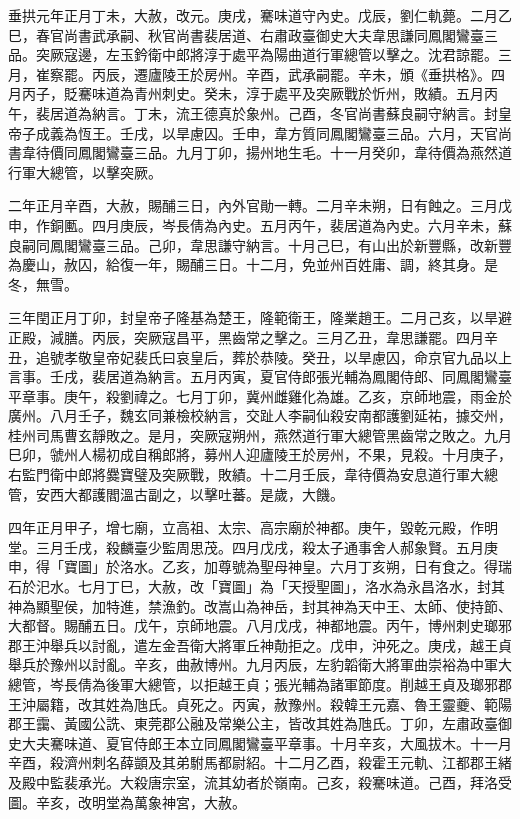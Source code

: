 \begin{pinyinscope}
 垂拱元年正月丁未，大赦，改元。庚戌，騫味道守內史。戊辰，劉仁軌薨。二月乙巳，春官尚書武承嗣、秋官尚書裴居道、右肅政臺御史大夫韋思謙同鳳閣鸞臺三品。突厥寇邊，左玉鈐衛中郎將淳于處平為陽曲道行軍總管以擊之。沈君諒罷。三月，崔察罷。丙辰，遷廬陵王於房州。辛酉，武承嗣罷。辛未，頒《垂拱格》。四月丙子，貶騫味道為青州刺史。癸未，淳于處平及突厥戰於忻州，敗績。五月丙午，裴居道為納言。丁未，流王德真於象州。己酉，冬官尚書蘇良嗣守納言。封皇帝子成義為恆王。壬戌，以旱慮囚。壬申，韋方質同鳳閣鸞臺三品。六月，天官尚書韋待價同鳳閣鸞臺三品。九月丁卯，揚州地生毛。十一月癸卯，韋待價為燕然道行軍大總管，以擊突厥。



 二年正月辛酉，大赦，賜酺三日，內外官勛一轉。二月辛未朔，日有蝕之。三月戊申，作銅匭。四月庚辰，岑長倩為內史。五月丙午，裴居道為內史。六月辛未，蘇良嗣同鳳閣鸞臺三品。己卯，韋思謙守納言。十月己巳，有山出於新豐縣，改新豐為慶山，赦囚，給復一年，賜酺三日。十二月，免並州百姓庸、調，終其身。是冬，無雪。



 三年閏正月丁卯，封皇帝子隆基為楚王，隆範衛王，隆業趙王。二月己亥，以旱避正殿，減膳。丙辰，突厥寇昌平，黑齒常之擊之。三月乙丑，韋思謙罷。四月辛丑，追號孝敬皇帝妃裴氏曰哀皇后，葬於恭陵。癸丑，以旱慮囚，命京官九品以上言事。壬戌，裴居道為納言。五月丙寅，夏官侍郎張光輔為鳳閣侍郎、同鳳閣鸞臺平章事。庚午，殺劉禕之。七月丁卯，冀州雌雞化為雄。乙亥，京師地震，雨金於廣州。八月壬子，魏玄同兼檢校納言，交趾人李嗣仙殺安南都護劉延祐，據交州，桂州司馬曹玄靜敗之。是月，突厥寇朔州，燕然道行軍大總管黑齒常之敗之。九月巳卯，虢州人楊初成自稱郎將，募州人迎廬陵王於房州，不果，見殺。十月庚子，右監門衛中郎將爨寶璧及突厥戰，敗績。十二月壬辰，韋待價為安息道行軍大總管，安西大都護閻溫古副之，以擊吐蕃。是歲，大饑。



 四年正月甲子，增七廟，立高祖、太宗、高宗廟於神都。庚午，毀乾元殿，作明堂。三月壬戌，殺麟臺少監周思茂。四月戊戌，殺太子通事舍人郝象賢。五月庚申，得「寶圖」於洛水。乙亥，加尊號為聖母神皇。六月丁亥朔，日有食之。得瑞石於汜水。七月丁巳，大赦，改「寶圖」為「天授聖圖」，洛水為永昌洛水，封其神為顯聖侯，加特進，禁漁釣。改嵩山為神岳，封其神為天中王、太師、使持節、大都督。賜酺五日。戊午，京師地震。八月戊戌，神都地震。丙午，博州刺史瑯邪郡王沖舉兵以討亂，遣左金吾衛大將軍丘神勣拒之。戊申，沖死之。庚戌，越王貞舉兵於豫州以討亂。辛亥，曲赦博州。九月丙辰，左豹韜衛大將軍曲崇裕為中軍大總管，岑長倩為後軍大總管，以拒越王貞；張光輔為諸軍節度。削越王貞及瑯邪郡王沖屬籍，改其姓為虺氏。貞死之。丙寅，赦豫州。殺韓王元嘉、魯王靈夔、範陽郡王靄、黃國公詵、東莞郡公融及常樂公主，皆改其姓為虺氏。丁卯，左肅政臺御史大夫騫味道、夏官侍郎王本立同鳳閣鸞臺平章事。十月辛亥，大風拔木。十一月辛酉，殺濟州刺名薛顗及其弟駙馬都尉紹。十二月乙酉，殺霍王元軌、江都郡王緒及殿中監裴承光。大殺唐宗室，流其幼者於嶺南。己亥，殺騫味道。己酉，拜洛受圖。辛亥，改明堂為萬象神宮，大赦。




\end{pinyinscope}
